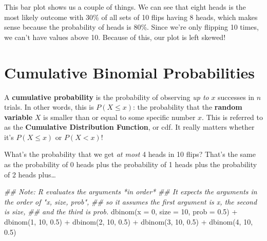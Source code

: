\documentclass[
  letterpaper,
  DIV=11,
  numbers=noendperiod,
  oneside]{scrreprt}
\newenvironment{Shaded}{\begin{snugshade}}{\end{snugshade}}
\newcommand{\AttributeTok}[1]{\textcolor[rgb]{0.40,0.45,0.13}{#1}}
\newcommand{\DecValTok}[1]{\textcolor[rgb]{0.68,0.00,0.00}{#1}}
\newcommand{\DocumentationTok}[1]{\textcolor[rgb]{0.37,0.37,0.37}{\textit{#1}}}
\newcommand{\FloatTok}[1]{\textcolor[rgb]{0.68,0.00,0.00}{#1}}
\newcommand{\FunctionTok}[1]{\textcolor[rgb]{0.28,0.35,0.67}{#1}}
\newcommand{\NormalTok}[1]{\textcolor[rgb]{0.00,0.23,0.31}{#1}}
\newcommand{\SpecialCharTok}[1]{\textcolor[rgb]{0.37,0.37,0.37}{#1}}
\begin{document}
This bar plot shows us a couple of things. We can see that eight heads
is the most likely outcome with 30\% of all sets of 10 flips having 8
heads, which makes sense because the probability of heads is 80\%. Since
we're only flipping 10 times, we can't have values above 10. Because of
this, our plot is left skewed!

\hypertarget{cumulative-binomial-probabilities}{%
\section{Cumulative Binomial
Probabilities}\label{cumulative-binomial-probabilities}}

A \textbf{cumulative probability} is the probability of observing
\emph{up to} \(x\) successes in \(n\) trials. In other words, this is
\(P(X \le x)\): the probability that the \textbf{random variable} \(X\)
is smaller than or equal to some specific number \(x\). This is referred
to as the \textbf{Cumulative Distribution Function}, or cdf. It really
matters whether it's \(P(X\le x)\) or \(P(X< x)\)!

What's the probability that we get \emph{at most} 4 heads in 10 flips?
That's the same as the probability of 0 heads plus the probability of 1
heads plus the probability of 2 heads plus\ldots{}

\begin{Shaded}
\begin{Highlighting}[]
\DocumentationTok{\#\# Note: R evaluates the arguments *in order*}
\DocumentationTok{\#\# It expects the arguments in the order of "x, size, prob",}
\DocumentationTok{\#\# so it assumes the first argument is x, the second is size,}
\DocumentationTok{\#\# and the third is prob.}
\FunctionTok{dbinom}\NormalTok{(}\AttributeTok{x =} \DecValTok{0}\NormalTok{, }\AttributeTok{size =} \DecValTok{10}\NormalTok{, }\AttributeTok{prob =} \FloatTok{0.5}\NormalTok{) }\SpecialCharTok{+}
  \FunctionTok{dbinom}\NormalTok{(}\DecValTok{1}\NormalTok{, }\DecValTok{10}\NormalTok{, }\FloatTok{0.5}\NormalTok{) }\SpecialCharTok{+}
  \FunctionTok{dbinom}\NormalTok{(}\DecValTok{2}\NormalTok{, }\DecValTok{10}\NormalTok{, }\FloatTok{0.5}\NormalTok{) }\SpecialCharTok{+}
  \FunctionTok{dbinom}\NormalTok{(}\DecValTok{3}\NormalTok{, }\DecValTok{10}\NormalTok{, }\FloatTok{0.5}\NormalTok{) }\SpecialCharTok{+}
  \FunctionTok{dbinom}\NormalTok{(}\DecValTok{4}\NormalTok{, }\DecValTok{10}\NormalTok{, }\FloatTok{0.5}\NormalTok{)}
\end{Highlighting}
\end{Shaded}
\end{document}
